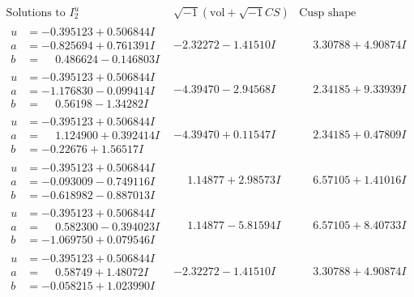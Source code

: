 \documentclass[1p]{elsarticle_modified}
\theoremstyle{definition}
\newcommand{\I}{\sqrt{-1}}
\begin{document}
$$\begin{array}{c|c|c}  
\text{Solutions to }I^u_{2}& \I (\text{vol} + \sqrt{-1}CS) & \text{Cusp shape}\\
 \hline 
\begin{aligned}
u &= -0.395123 + 0.506844 I \\
a &= -0.825694 + 0.761391 I \\
b &= \phantom{-}0.486624 - 0.146803 I\end{aligned}
 & -2.32272 - 1.41510 I & \phantom{-}3.30788 + 4.90874 I \\ \hline\begin{aligned}
u &= -0.395123 + 0.506844 I \\
a &= -1.176830 - 0.099414 I \\
b &= \phantom{-}0.56198 - 1.34282 I\end{aligned}
 & -4.39470 - 2.94568 I & \phantom{-}2.34185 + 9.33939 I \\ \hline\begin{aligned}
u &= -0.395123 + 0.506844 I \\
a &= \phantom{-}1.124900 + 0.392414 I \\
b &= -0.22676 + 1.56517 I\end{aligned}
 & -4.39470 + 0.11547 I & \phantom{-}2.34185 + 0.47809 I \\ \hline\begin{aligned}
u &= -0.395123 + 0.506844 I \\
a &= -0.093009 - 0.749116 I \\
b &= -0.618982 - 0.887013 I\end{aligned}
 & \phantom{-}1.14877 + 2.98573 I & \phantom{-}6.57105 + 1.41016 I \\ \hline\begin{aligned}
u &= -0.395123 + 0.506844 I \\
a &= \phantom{-}0.582300 - 0.394023 I \\
b &= -1.069750 + 0.079546 I\end{aligned}
 & \phantom{-}1.14877 - 5.81594 I & \phantom{-}6.57105 + 8.40733 I \\ \hline\begin{aligned}
u &= -0.395123 + 0.506844 I \\
a &= \phantom{-}0.58749 + 1.48072 I \\
b &= -0.058215 + 1.023990 I\end{aligned}
 & -2.32272 - 1.41510 I & \phantom{-}3.30788 + 4.90874 I \\ \hline\begin{aligned}

\end{aligned}
\end{array}$$
\end{document}
